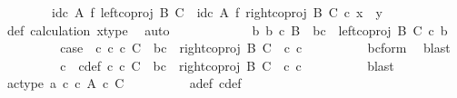 \begin{isabellebody}
\ \ \ \ \ \ \ \ {\isacharparenleft}{\kern0pt}id\isactrlsub c\ A\ {\isasymtimes}\isactrlsub f\ left{\isacharunderscore}{\kern0pt}coproj\ B\ C{\isacharparenright}{\kern0pt}\ {\isasymamalg}\ {\isacharparenleft}{\kern0pt}id\isactrlsub c\ A\ {\isasymtimes}\isactrlsub f\ right{\isacharunderscore}{\kern0pt}coproj\ B\ C{\isacharparenright}{\kern0pt}\ {\isasymcirc}\isactrlsub c\ x\ {\isacharequal}{\kern0pt}\ y{\isachardoublequoteclose}\isanewline
\ \ \ \ \ \ \ \ \isamarkupfalse%
\ {\isasymphi}{\isacharunderscore}{\kern0pt}def\ calculation\ x{\isacharunderscore}{\kern0pt}type\ \isamarkupfalse%
\ auto\isanewline
\ \ \ \ \isamarkupfalse%
\isanewline
\ \ \ \ \ \ \isamarkupfalse%
\ {\isachardoublequoteopen}{\isasymnexists}b{\isachardot}{\kern0pt}\ b\ {\isasymin}\isactrlsub c\ B\ {\isasymand}\ bc\ {\isacharequal}{\kern0pt}\ left{\isacharunderscore}{\kern0pt}coproj\ B\ C\ {\isasymcirc}\isactrlsub c\ b{\isachardoublequoteclose}\isanewline
\ \ \ \ \ \ \isamarkupfalse%
\ \isamarkupfalse%
\ case{}{\isacharcolon}{\kern0pt}\ {\isachardoublequoteopen}{\isasymexists}\ c{\isachardot}{\kern0pt}\ c\ {\isasymin}\isactrlsub c\ C\ {\isasymand}\ bc\ {\isacharequal}{\kern0pt}\ {\isacharparenleft}{\kern0pt}right{\isacharunderscore}{\kern0pt}coproj\ B\ C\ \ {\isasymcirc}\isactrlsub c\ c{\isacharparenright}{\kern0pt}{\isachardoublequoteclose}\isanewline
\ \ \ \ \ \ \ \ \isamarkupfalse%
\ bc{\isacharunderscore}{\kern0pt}form\ \isamarkupfalse%
\ blast\isanewline
\ \ \ \ \ \ \isamarkupfalse%
\ \isamarkupfalse%
\ c\ \ c{\isacharunderscore}{\kern0pt}def{\isacharcolon}{\kern0pt}\ {\isachardoublequoteopen}c\ {\isasymin}\isactrlsub c\ C\ {\isasymand}\ bc\ {\isacharequal}{\kern0pt}\ right{\isacharunderscore}{\kern0pt}coproj\ B\ C\ \ {\isasymcirc}\isactrlsub c\ c{\isachardoublequoteclose}\isanewline
\ \ \ \ \ \ \ \ \isamarkupfalse%
\ blast\isanewline
\ \ \ \ \ \ \isamarkupfalse%
\ \isamarkupfalse%
\ ac{\isacharunderscore}{\kern0pt}type{\isacharcolon}{\kern0pt}\ {\isachardoublequoteopen}{\isasymlangle}a{\isacharcomma}{\kern0pt}\ c{\isasymrangle}\ {\isasymin}\isactrlsub c\ {\isacharparenleft}{\kern0pt}A\ {\isasymtimes}\isactrlsub c\ C{\isacharparenright}{\kern0pt}{\isachardoublequoteclose}\isanewline
\ \ \ \ \ \ \ \ \isamarkupfalse%
\ a{\isacharunderscore}{\kern0pt}def\ c{\isacharunderscore}{\kern0pt}def\ \isamarkupfalse%

\end{isabellebody}
